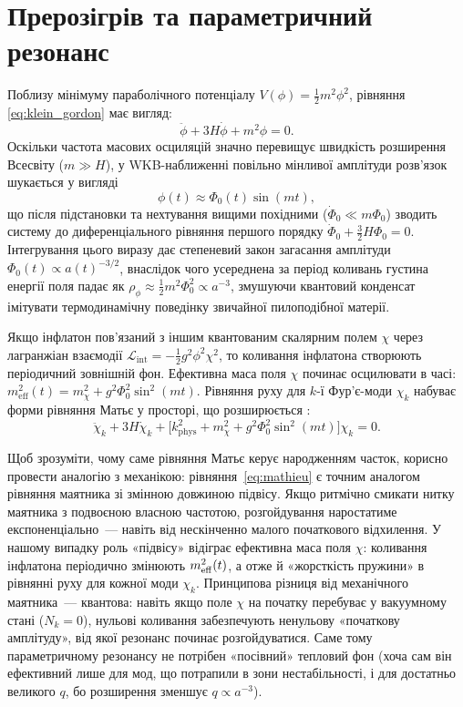 \section{Прерозігрів та параметричний резонанс}

Поблизу мінімуму параболічного потенціалу $V(\phi) = \frac{1}{2}m^2\phi^2$, рівняння \eqref{eq:klein_gordon} має вигляд:
\begin{equation*}
     \ddot{\phi} + 3H\dot{\phi} + m^2\phi = 0.
\end{equation*}
Оскільки частота масових осциляцій значно перевищує швидкість розширення Всесвіту ($m \gg H$), у WKB-наближенні повільно мінливої амплітуди розв'язок шукається у вигляді
\begin{equation*}
    \phi(t) \approx \Phi_0(t)\sin(mt),
\end{equation*}
що після підстановки та нехтування вищими похідними ($\dot{\Phi}_0 \ll m\Phi_0$) зводить систему до диференціального рівняння першого порядку $\dot{\Phi}_0 + \frac{3}{2}H\Phi_0 = 0$. Інтегрування цього виразу дає степеневий закон загасання амплітуди $\Phi_0(t) \propto a(t)^{-3/2}$, внаслідок чого усереднена за період коливань густина енергії поля падає як $\rho_\phi \approx \frac{1}{2}m^2\Phi_0^2 \propto a^{-3}$, змушуючи квантовий конденсат імітувати термодинамічну поведінку звичайної пилоподібної матерії.

Якщо інфлатон пов'язаний з іншим квантованим скалярним полем $\chi$ через лагранжіан взаємодії $\mathcal{L}_{\mathrm{int}} = -\frac{1}{2}g^2\phi^2\chi^2$, то коливання інфлатона створюють періодичний зовнішній фон. Ефективна маса поля $\chi$ починає осцилювати в часі: $m_{\mathrm{eff}}^2(t) = m_\chi^2 + g^2\Phi_0^2\sin^2(mt)$. Рівняння руху для $k$-ї Фур'є-моди $\chi_k$ набуває форми рівняння Матьє у просторі, що розширюється \cite{kofman_1994, kofman_1997}:
\begin{equation}\label{eq:mathieu}
  \ddot{\chi}_k + 3H\dot{\chi}_k + \bigl[k_\mathrm{phys}^2 + m_\chi^2 + g^2\Phi_0^2\sin^2(mt)\bigr]\chi_k = 0.
\end{equation}

Щоб зрозуміти, чому саме рівняння Матьє керує народженням часток, корисно провести аналогію з механікою: рівняння~\eqref{eq:mathieu} є точним аналогом рівняння маятника зі змінною довжиною підвісу. Якщо ритмічно смикати нитку маятника з подвоєною власною частотою, розгойдування наростатиме експоненціально~--- навіть від нескінченно малого початкового відхилення. У нашому випадку роль «підвісу» відіграє ефективна маса поля $\chi$: коливання інфлатона періодично змінюють $m_{\rm eff}^2(t)$, а отже й «жорсткість пружини» в рівнянні руху для кожної моди $\chi_k$. Принципова різниця від механічного маятника~--- квантова: навіть якщо поле $\chi$ на початку перебуває у вакуумному стані ($N_k = 0$), нульові коливання забезпечують ненульову «початкову амплітуду», від якої резонанс починає розгойдуватися. Саме тому параметричному резонансу не потрібен «посівний» тепловий фон (хоча сам він ефективний лише для мод, що потрапили в зони нестабільності, і для достатньо великого $q$, бо розширення зменшує $q\propto a^{-3}$).

